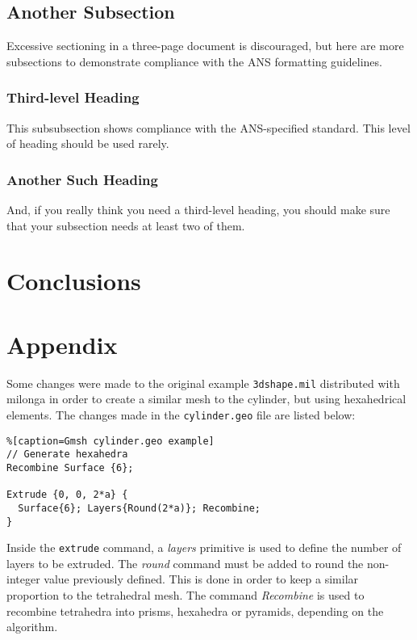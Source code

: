 \documentclass{anstrans}
\begin{document}
\subsection{Another Subsection}
Excessive sectioning in a three-page document is discouraged, but here are more
subsections to demonstrate compliance with the ANS formatting guidelines.

\subsubsection{Third-level Heading}
This subsubsection shows compliance with the ANS-specified standard. This level
of heading should be used rarely.

\subsubsection{Another Such Heading}
And, if you really think you need a third-level heading, you should make sure
that your subsection needs at least two of them.

\section{Conclusions}

\appendix
\section{Appendix}
\label{Appendix}
Some changes were made to the original example \texttt{3dshape.mil} distributed
with milonga in order to create a similar mesh to the cylinder, but using
hexahedrical elements. The changes made in the \texttt{cylinder.geo} file
are listed below:

\begin{lstlisting}%[caption=Gmsh cylinder.geo example]
// Generate hexahedra
Recombine Surface {6};

Extrude {0, 0, 2*a} {
  Surface{6}; Layers{Round(2*a)}; Recombine;
}
\end{lstlisting}

Inside the \texttt{extrude} command, a \textit{layers} primitive is used to
define the number of layers to be extruded. The \textit{round} command must
be added to round the non-integer value previously defined. This is done
in order to keep a similar proportion to the tetrahedral mesh. The
command \textit{Recombine} is used to recombine tetrahedra into prisms,
hexahedra or pyramids, depending on the algorithm.
\end{document}

